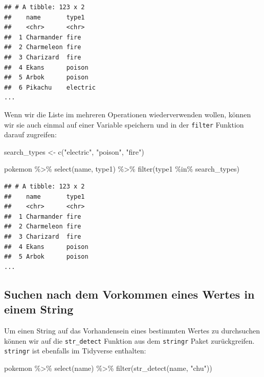 \documentclass[
]{book}
\newenvironment{Shaded}{\begin{snugshade}}{\end{snugshade}}
\newcommand{\FunctionTok}[1]{\textcolor[rgb]{0.00,0.00,0.00}{#1}}
\newcommand{\NormalTok}[1]{#1}
\newcommand{\OtherTok}[1]{\textcolor[rgb]{0.56,0.35,0.01}{#1}}
\newcommand{\SpecialCharTok}[1]{\textcolor[rgb]{0.00,0.00,0.00}{#1}}
\newcommand{\StringTok}[1]{\textcolor[rgb]{0.31,0.60,0.02}{#1}}
\begin{document}
\begin{verbatim}
## # A tibble: 123 x 2
##    name       type1   
##    <chr>      <chr>   
##  1 Charmander fire    
##  2 Charmeleon fire    
##  3 Charizard  fire    
##  4 Ekans      poison  
##  5 Arbok      poison  
##  6 Pikachu    electric
...
\end{verbatim}

Wenn wir die Liste im mehreren Operationen wiederverwenden wollen, können wir sie auch einmal auf einer Variable speichern und in der \texttt{filter} Funktion darauf zugreifen:

\begin{Shaded}
\begin{Highlighting}[]
\NormalTok{search\_types }\OtherTok{\textless{}{-}} \FunctionTok{c}\NormalTok{(}\StringTok{"electric"}\NormalTok{, }\StringTok{"poison"}\NormalTok{, }\StringTok{"fire"}\NormalTok{)}

\NormalTok{pokemon }\SpecialCharTok{\%\textgreater{}\%}
  \FunctionTok{select}\NormalTok{(name, type1) }\SpecialCharTok{\%\textgreater{}\%}
  \FunctionTok{filter}\NormalTok{(type1 }\SpecialCharTok{\%in\%}\NormalTok{ search\_types)}
\end{Highlighting}
\end{Shaded}

\begin{verbatim}
## # A tibble: 123 x 2
##    name       type1   
##    <chr>      <chr>   
##  1 Charmander fire    
##  2 Charmeleon fire    
##  3 Charizard  fire    
##  4 Ekans      poison  
##  5 Arbok      poison  
...
\end{verbatim}

\hypertarget{suchen-nach-dem-vorkommen-eines-wertes-in-einem-string}{%
\subsection{Suchen nach dem Vorkommen eines Wertes in einem String}\label{suchen-nach-dem-vorkommen-eines-wertes-in-einem-string}}

Um einen String auf das Vorhandensein eines bestimmten Wertes zu durchsuchen können wir auf die \texttt{str\_detect} Funktion aus dem \texttt{stringr} Paket zurückgreifen. \texttt{stringr} ist ebenfalls im Tidyverse enthalten:

\begin{Shaded}
\begin{Highlighting}[]
\NormalTok{pokemon }\SpecialCharTok{\%\textgreater{}\%}
  \FunctionTok{select}\NormalTok{(name) }\SpecialCharTok{\%\textgreater{}\%}
  \FunctionTok{filter}\NormalTok{(}\FunctionTok{str\_detect}\NormalTok{(name, }\StringTok{"chu"}\NormalTok{))}
\end{Highlighting}
\end{Shaded}
\end{document}

